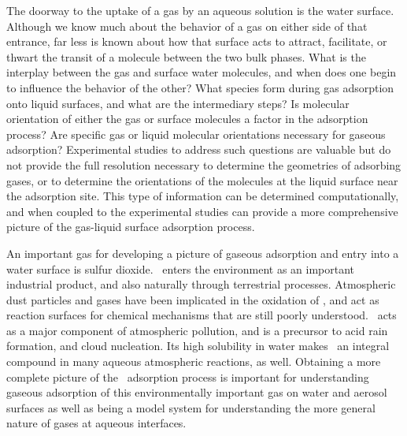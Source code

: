 \documentclass{article}
\begin{document}
The doorway to the uptake of a gas by an aqueous solution is the water surface. Although we know much about the behavior of a gas on either side of that entrance, far less is known about how that surface acts to attract, facilitate, or thwart the transit of a molecule between the two bulk phases. What is the interplay between the gas and surface water molecules, and when does one begin to influence the behavior of the other? What species form during gas adsorption onto liquid surfaces, and what are the intermediary steps?  Is molecular orientation of either the gas or surface molecules a factor in the adsorption process? Are specific gas or liquid molecular orientations necessary for gaseous adsorption?  Experimental studies to address such questions are valuable but do not provide the full resolution necessary to determine the geometries of adsorbing gases, or to determine the orientations of the molecules at the liquid surface near the adsorption site. This type of information can be determined computationally, and when coupled to the experimental studies can provide a more comprehensive picture of the gas-liquid surface adsorption process.

An important gas for developing a picture of gaseous adsorption and entry into a water surface is sulfur dioxide.\cite{Donaldson1995,Lattanzi2010,Shah2011,Tzivian2011,Johns2011,Faloona2009,Jurkat2010,Wu2011,Jayne1990,Jayne1990a,Yang2002} \suldiox~enters the environment as an important industrial product, and also naturally through terrestrial processes. Atmospheric dust particles and gases have been implicated in the oxidation of \suldiox, and act as reaction surfaces for chemical mechanisms that are still poorly understood.\cite{Baltrusaitis2011,Rubasinghege2010,Li2007,Madsen2008,Boniface2000} \suldiox~acts as a major component of atmospheric pollution, and is a precursor to acid rain formation, and cloud nucleation. Its high solubility in water makes \suldiox~an integral compound in many aqueous atmospheric reactions, as well.  Obtaining a more complete picture of the \suldiox~adsorption process is important for understanding gaseous adsorption of this environmentally important gas on water and aerosol surfaces as well as being a model system for understanding the more general nature of gases at aqueous interfaces.
\end{document}
